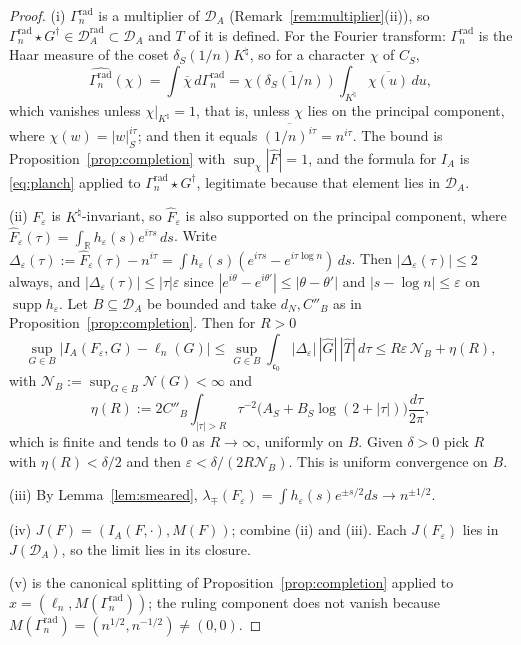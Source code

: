 \documentclass[11pt]{amsart}
\theoremstyle{definition}
\theoremstyle{remark}
\newcommand{\R}{\mathbb R}
\newcommand{\supp}{\operatorname{supp}}
\newcommand{\Knat}{K^{\natural}}
\newcommand{\Drad}{\mathcal D_A^{\mathrm{rad}}}
\newcommand{\DA}{\mathcal D_A}
\begin{document}
\begin{proof}
(i) $\Gamma_n^{\mathrm{rad}}$ is a multiplier of $\DA$
(Remark~\ref{rem:multiplier}(ii)), so
$\Gamma_n^{\mathrm{rad}}\star G^\dagger\in\Drad\subset\DA$ and $T$ of it is
defined. For the Fourier transform: $\Gamma_n^{\mathrm{rad}}$ is the Haar
measure of the coset $\delta_S(1/n)\Knat$, so for a character $\chi$ of $C_S$,
\[
  \widehat{\Gamma_n^{\mathrm{rad}}}(\chi)
   =\int\overline\chi\,d\Gamma_n^{\mathrm{rad}}
   =\overline{\chi(\delta_S(1/n))}\int_{\Knat}\overline{\chi(u)}\,du,
\]
which vanishes unless $\chi|_{\Knat}=1$, that is, unless $\chi$ lies on the
principal component, where $\chi(w)=|w|_S^{i\tau}$; and then it equals
$\overline{(1/n)^{i\tau}}=n^{i\tau}$. The bound is
Proposition~\ref{prop:completion} with $\sup_\chi|\widehat F|=1$, and the
formula for $I_A$ is \eqref{eq:planch} applied to
$\Gamma_n^{\mathrm{rad}}\star G^\dagger$, legitimate because that element lies
in $\DA$.

(ii) $F_\varepsilon$ is $\Knat$-invariant, so $\widehat F_\varepsilon$ is also
supported on the principal component, where
$\widehat F_\varepsilon(\tau)=\int_\R h_\varepsilon(s)e^{i\tau s}\,ds$. Write
$\Delta_\varepsilon(\tau):=\widehat F_\varepsilon(\tau)-n^{i\tau}
=\int h_\varepsilon(s)(e^{i\tau s}-e^{i\tau\log n})\,ds$. Then
$|\Delta_\varepsilon(\tau)|\le2$ always, and
$|\Delta_\varepsilon(\tau)|\le|\tau|\varepsilon$ since
$|e^{i\theta}-e^{i\theta'}|\le|\theta-\theta'|$ and $|s-\log n|\le\varepsilon$
on $\supp h_\varepsilon$. Let $B\subseteq\DA$ be bounded and take $d_N,C''_B$
as in Proposition~\ref{prop:completion}. Then for $R>0$
\[
  \sup_{G\in B}\bigl|I_A(F_\varepsilon,G)-\ell_n(G)\bigr|
   \le\sup_{G\in B}\int_{\mathfrak c_0}|\Delta_\varepsilon|\,|\widehat G|\,
     |\widehat T|\,d\tau
   \le R\varepsilon\,\mathcal N_B+\eta(R),
\]
with $\mathcal N_B:=\sup_{G\in B}\mathcal N(G)<\infty$ and
\[
  \eta(R):=2C''_B\int_{|\tau|>R}\tau^{-2}\bigl(A_S+B_S\log(2+|\tau|)\bigr)
    \frac{d\tau}{2\pi},
\]
which is finite and tends to $0$ as $R\to\infty$, uniformly on $B$. Given
$\delta>0$ pick $R$ with $\eta(R)<\delta/2$ and then
$\varepsilon<\delta/(2R\mathcal N_B)$. This is uniform convergence on $B$.

(iii) By Lemma~\ref{lem:smeared},
$\lambda_\mp(F_\varepsilon)=\int h_\varepsilon(s)e^{\pm s/2}ds\to n^{\pm1/2}$.

(iv) $J(F)=(I_A(F,\cdot),M(F))$; combine (ii) and (iii). Each
$J(F_\varepsilon)$ lies in $J(\DA)$, so the limit lies in its closure.

(v) is the canonical splitting of Proposition~\ref{prop:completion} applied to
$x=(\ell_n,M(\Gamma_n^{\mathrm{rad}}))$; the ruling component does not vanish
because $M(\Gamma_n^{\mathrm{rad}})=(n^{1/2},n^{-1/2})\ne(0,0)$.
\end{proof}
\end{document}
